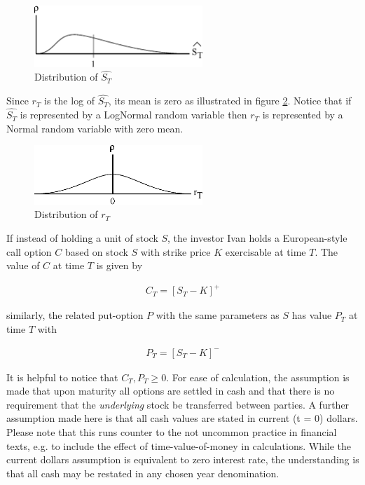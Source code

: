 \begin{figure}
  \centering
  \includegraphics[width=2.5in]{Images/S_T_hat.eps}
  \caption[Distribution of Normalized Stock Price at time T]
          {Distribution of $\hat{S_T}$}
  \label{fig:S_T_hat}
\end{figure}

Since $r_T$ is the log of $\hat{S_T}$, its mean is zero as illustrated in figure \ref{fig:r_T}. Notice that if $\hat{S_T}$ is represented by a LogNormal random variable then $r_T$ is represented by a Normal random variable with zero mean.

\begin{figure}
  \centering
  \includegraphics[width=2.5in]{Images/r_T.eps}
  \caption[Distribution of Return Rate at time T]
          {Distribution of $r_T$}
  \label{fig:r_T}
\end{figure}

If instead of holding a unit of stock $S$, the investor Ivan holds a European-style call option $C$ based on stock $S$ with strike price $K$ exercisable at time $T$. The value of $C$ at time $T$ is given by

\begin{align*}
C_T = [S_T - K]^+
\end{align*}

similarly, the related put-option $P$ with the same parameters as $S$ has value $P_T$ at time $T$ with

\begin{align*}
P_T = [S_T - K]^-
\end{align*}

It is helpful to notice that $C_T, P_T \ge 0$. For ease of calculation, the assumption is made that upon maturity all options are settled in cash and that there is no requirement that the \emph{underlying} stock be transferred between parties. A further assumption made here is that all cash values are stated in current (t = 0) dollars. Please note that this runs counter to the not uncommon practice in financial texts, e.g. \cite{dineen00} to include the effect of time-value-of-money in calculations. While the current dollars assumption is equivalent to zero interest rate, the understanding is that all cash may be restated in any chosen year denomination.

